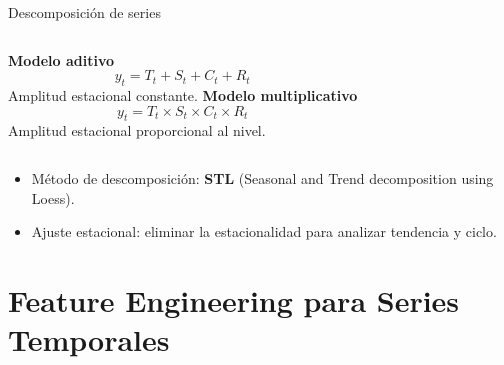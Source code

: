 \documentclass[aspectratio=169, 10pt, xcolor=table]{beamer}
\begin{document}
\begin{frame}{Descomposición de series}
    \begin{columns}[t]
        \textbf{Modelo aditivo}
        \[
        y_t = T_t + S_t + C_t + R_t
        \]
        Amplitud estacional constante.
        \textbf{Modelo multiplicativo}
        \[
        y_t = T_t \times S_t \times C_t \times R_t
        \]
        Amplitud estacional proporcional al nivel.
    \end{columns}
    \vspace{0.3cm}
    \begin{itemize}
        \item Método de descomposición: \textbf{STL} (Seasonal and Trend decomposition using Loess).
        \item Ajuste estacional: eliminar la estacionalidad para analizar tendencia y ciclo.
    \end{itemize}
\end{frame}

\section{Feature Engineering para Series Temporales}
\end{document}
